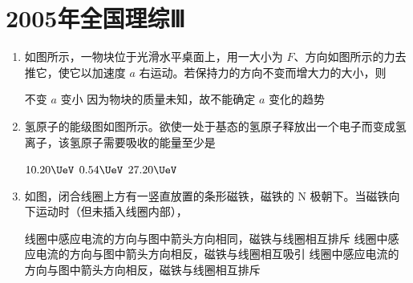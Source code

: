 \documentclass[\gkver]{gaokaozhenti}
\begin{document}
\chapter{2005年全国理综Ⅲ}

\begin{enumerate}
\item
如图所示，一物块位于光滑水平桌面上，用一大小为 $F$、方向如图所示的力去推它，使它以加速度 $a$ 右运动。若保持力的方向不变而增大力的大小，则


{不变}
{$a$ 变小}
{因为物块的质量未知，故不能确定 $a$ 变化的趋势}


\item
氢原子的能级图如图所示。欲使一处于基态的氢原子释放出一个电子而变成氢离子，该氢原子需要吸收的能量至少是


\fourchoices[answer=A]
{$13.60\UeV$}
{$10.20\UeV$}
{$0.54\UeV$}
{$27.20\UeV$}


\item
如图，闭合线圈上方有一竖直放置的条形磁铁，磁铁的 N 极朝下。当磁铁向下运动时（但未插入线圈内部），


{线圈中感应电流的方向与图中箭头方向相同，磁铁与线圈相互排斥}
{线圈中感应电流的方向与图中箭头方向相反，磁铁与线圈相互吸引}
{线圈中感应电流的方向与图中箭头方向相反，磁铁与线圈相互排斥}



\end{enumerate}
\end{document}

